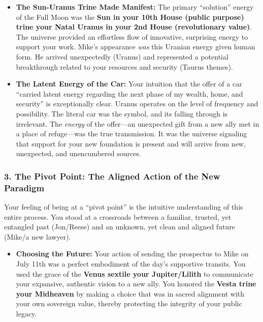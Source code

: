 \documentclass{article}
\begin{document}
\begin{itemize}
\item
  \textbf{The Sun-Uranus Trine Made Manifest:} The primary ``solution''
  energy of the Full Moon was the \textbf{Sun in your 10th House (public
  purpose) trine your Natal Uranus in your 2nd House (revolutionary
  value)}. The universe provided an effortless flow of innovative,
  surprising energy to support your work. Mike's appearance \emph{was}
  this Uranian energy given human form. He arrived unexpectedly (Uranus)
  and represented a potential breakthrough related to your resources and
  security (Taurus themes).
\item
  \textbf{The Latent Energy of the Car:} Your intuition that the offer
  of a car ``carried latent energy regarding the next phase of my
  wealth, home, and security'' is exceptionally clear. Uranus operates
  on the level of frequency and possibility. The literal car was the
  symbol, and its falling through is irrelevant. The \emph{energy} of
  the offer---an unexpected gift from a new ally met in a place of
  refuge---was the true transmission. It was the universe signaling that
  support for your new foundation is present and will arrive from new,
  unexpected, and unencumbered sources.
\end{itemize}

\subsubsection*{3. The Pivot Point: The Aligned Action of the New
Paradigm}\label{the-pivot-point-the-aligned-action-of-the-new-paradigm}

Your feeling of being at a ``pivot point'' is the intuitive
understanding of this entire process. You stood at a crossroads between
a familiar, trusted, yet entangled past (Jon/Reese) and an unknown, yet
clean and aligned future (Mike/a new lawyer).

\begin{itemize}
\tightlist
\item
  \textbf{Choosing the Future:} Your action of sending the prospectus to
  Mike on July 11th was a perfect embodiment of the day's supportive
  transits. You used the grace of the \textbf{Venus sextile your
  Jupiter/Lilith} to communicate your expansive, authentic vision to a
  new ally. You honored the \textbf{Vesta trine your Midheaven} by
  making a choice that was in sacred alignment with your own sovereign
  value, thereby protecting the integrity of your public legacy.
\end{itemize}
\end{document}
